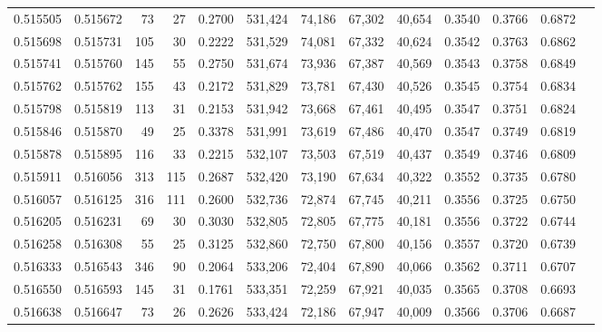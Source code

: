 \begin{tabular}{rrrrrrrrrrrrr}
0.515505 & 0.515672 &    73 &    27 &                                     0.2700 & 531,424 &  74,186 &  67,302 &  40,654 & 0.3540 & 0.3766 & 0.6872 \\
0.515698 & 0.515731 &   105 &    30 &                                     0.2222 & 531,529 &  74,081 &  67,332 &  40,624 & 0.3542 & 0.3763 & 0.6862 \\
0.515741 & 0.515760 &   145 &    55 &                                     0.2750 & 531,674 &  73,936 &  67,387 &  40,569 & 0.3543 & 0.3758 & 0.6849 \\
0.515762 & 0.515762 &   155 &    43 &                                     0.2172 & 531,829 &  73,781 &  67,430 &  40,526 & 0.3545 & 0.3754 & 0.6834 \\
0.515798 & 0.515819 &   113 &    31 &                                     0.2153 & 531,942 &  73,668 &  67,461 &  40,495 & 0.3547 & 0.3751 & 0.6824 \\
0.515846 & 0.515870 &    49 &    25 &                                     0.3378 & 531,991 &  73,619 &  67,486 &  40,470 & 0.3547 & 0.3749 & 0.6819 \\
0.515878 & 0.515895 &   116 &    33 &                                     0.2215 & 532,107 &  73,503 &  67,519 &  40,437 & 0.3549 & 0.3746 & 0.6809 \\
0.515911 & 0.516056 &   313 &   115 &                                     0.2687 & 532,420 &  73,190 &  67,634 &  40,322 & 0.3552 & 0.3735 & 0.6780 \\
0.516057 & 0.516125 &   316 &   111 &                                     0.2600 & 532,736 &  72,874 &  67,745 &  40,211 & 0.3556 & 0.3725 & 0.6750 \\
0.516205 & 0.516231 &    69 &    30 &                                     0.3030 & 532,805 &  72,805 &  67,775 &  40,181 & 0.3556 & 0.3722 & 0.6744 \\
0.516258 & 0.516308 &    55 &    25 &                                     0.3125 & 532,860 &  72,750 &  67,800 &  40,156 & 0.3557 & 0.3720 & 0.6739 \\
0.516333 & 0.516543 &   346 &    90 &                                     0.2064 & 533,206 &  72,404 &  67,890 &  40,066 & 0.3562 & 0.3711 & 0.6707 \\
0.516550 & 0.516593 &   145 &    31 &                                     0.1761 & 533,351 &  72,259 &  67,921 &  40,035 & 0.3565 & 0.3708 & 0.6693 \\
0.516638 & 0.516647 &    73 &    26 &                                     0.2626 & 533,424 &  72,186 &  67,947 &  40,009 & 0.3566 & 0.3706 & 0.6687 \\

\end{tabular}

